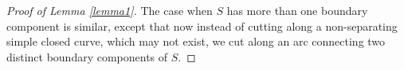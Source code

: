 \documentclass[11pt]{amsart}
\theoremstyle{remark}
\numberwithin{equation}{section}
\newcommand{\Mod}{\mathrm{Mod}}
\begin{document}
\begin {proof}[Proof of Lemma \ref{lemma1}]
The case when $S$ has more than one boundary component is similar, except that now instead of cutting along a non-separating simple closed curve, which may not exist, we cut along an arc connecting two distinct boundary components of $S$.
%
 \end {proof}
\end{document}
